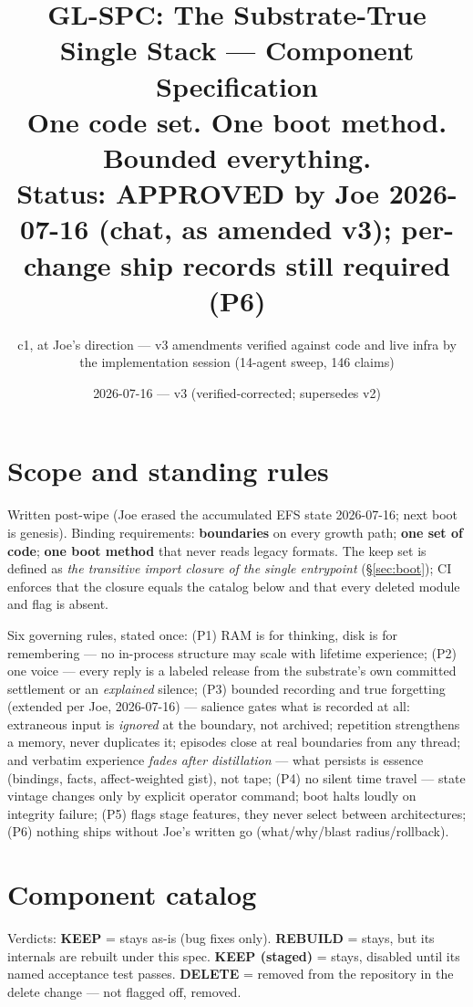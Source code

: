 \documentclass[11pt]{article}
\title{GL-SPC: The Substrate-True Single Stack — Component Specification\\
\large One code set. One boot method. Bounded everything.\\
\normalsize Status: \textbf{APPROVED by Joe 2026-07-16 (chat, as amended v3); per-change ship records still required (P6)}}
\author{c1, at Joe's direction — v3 amendments verified against code and live infra by the implementation session (14-agent sweep, 146 claims)}
\date{2026-07-16 — v3 (verified-corrected; supersedes v2)}
\newcommand{\keep}{\textbf{KEEP}}
\newcommand{\keepstaged}{\textbf{KEEP (staged)}}
\newcommand{\rebuild}{\textbf{REBUILD}}
\newcommand{\del}{\textbf{DELETE}}
\begin{document}
\maketitle

\section{Scope and standing rules}

Written post-wipe (Joe erased the accumulated EFS state 2026-07-16; next boot
is genesis). Binding requirements: \textbf{boundaries} on every growth path;
\textbf{one set of code}; \textbf{one boot method} that never reads legacy
formats. The keep set is defined as \emph{the transitive import closure of
the single entrypoint} (\S\ref{sec:boot}); CI enforces that the closure
equals the catalog below and that every deleted module and flag is absent.

Six governing rules, stated once: (P1) RAM is for thinking, disk is for
remembering — no in-process structure may scale with lifetime experience;
(P2) one voice — every reply is a labeled release from the substrate's own
committed settlement or an \emph{explained} silence; (P3) bounded recording and true forgetting (extended per Joe,
2026-07-16) — salience gates what is recorded at all: extraneous input is
\emph{ignored} at the boundary, not archived; repetition strengthens a
memory, never duplicates it; episodes close at real boundaries from any
thread; and verbatim experience \emph{fades after distillation} — what
persists is essence (bindings, facts, affect-weighted gist), not tape; (P4) no silent time travel — state vintage
changes only by explicit operator command; boot halts loudly on integrity
failure; (P5) flags stage features, they never select between architectures;
(P6) nothing ships without Joe's written go (what/why/blast radius/rollback).

\section{Component catalog}\label{sec:catalog}

Verdicts: \keep{} = stays as-is (bug fixes only). \rebuild{} = stays, but its
internals are rebuilt under this spec. \keepstaged{} = stays, disabled until
its named acceptance test passes. \del{} = removed from the repository in the
delete change — not flagged off, removed.
\end{document}
